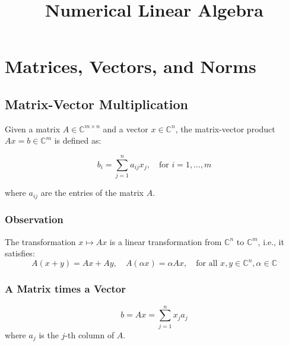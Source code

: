 \documentclass[11pt]{article}
\title{\textbf{Numerical Linear Algebra}}
\author{}
\date{}
\begin{document}
\maketitle

\section{Matrices, Vectors, and Norms}
\subsection{Matrix-Vector Multiplication}
Given a matrix \( A \in \mathbb{C}^{m \times n} \) and a vector \( x \in \mathbb{C}^n \), the matrix-vector product \( Ax = b \in \mathbb{C}^m \) is defined as:

\[
b_i = \sum_{j=1}^{n} a_{ij} x_j, \quad \text{for } i = 1, \ldots, m
\]

where \( a_{ij} \) are the entries of the matrix \( A \).

\subsubsection*{Observation}
The transformation \( x \mapsto Ax \) is a linear transformation from \( \mathbb{C}^n \) to \( \mathbb{C}^m \), i.e., it satisfies:
\[
A(x + y) = Ax + Ay, \quad A(\alpha x) = \alpha Ax, \quad \text{for all } x, y \in \mathbb{C}^n, \alpha \in \mathbb{C}
\]

\subsubsection{A Matrix times a Vector}
\[b = Ax = \sum_{j=1}^{n} x_j a_j\]
where \( a_j \) is the \( j \)-th column of \( A \).
\end{document}
